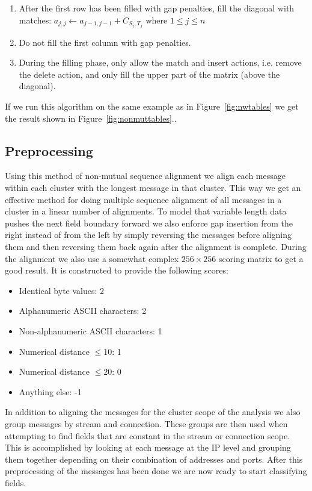 \documentclass[a4paper]{report}
\begin{document}
\begin{enumerate}
    \item After the first row has been filled with gap penalties, fill the
        diagonal with matches: $a_{j,j} \gets a_{j - 1, j - 1} + C_{S_j,T_j}$
        where $1 \le j \le n$
    \item Do not fill the first column with gap penalties.
    \item During the filling phase, only allow the match and insert actions,
        i.e. remove the delete action, and only fill the upper part of the
        matrix (above the diagonal).
\end{enumerate}

If we run this algorithm on the same example as in Figure~\ref{fig:nwtables}
we get the result shown in Figure~\ref{fig:nonmuttables}..

\subsection{Preprocessing}
Using this method of non-mutual sequence alignment we align each message within
each cluster with the longest message in that cluster. This way we get an
effective method for doing multiple sequence alignment of all messages in a
cluster in a linear number of alignments. To model that variable length data
pushes the next field boundary forward we also enforce gap insertion from the
right instead of from the left by simply reversing the messages before aligning
them and then reversing them back again after the alignment is complete. During
the alignment we also use a somewhat complex $256 \times 256$ scoring matrix to
get a good result. It is constructed to provide the following scores:

\begin{itemize}
    \item Identical byte values: 2
    \item Alphanumeric ASCII characters: 2
    \item Non-alphanumeric ASCII characters: 1
    \item Numerical distance $\le 10$: 1
    \item Numerical distance $\le 20$: 0
    \item Anything else: -1
\end{itemize}

In addition to aligning the messages for the cluster scope of the analysis we
also group messages by stream and connection. These groups are then used when
attempting to find fields that are constant in the stream or connection scope.
This is accomplished by looking at each message at the IP level and grouping
them together depending on their combination of addresses and ports. After this
preprocessing of the messages has been done we are now ready to start
classifying fields.
\end{document}
